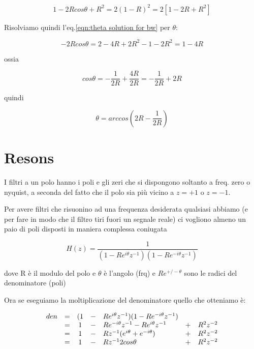 		\begin{equation}\label{eqn:theta solution for bw}
    1 - 2 R cos \theta + R^2 = 2 (1 - R)^2 = 2 [ 1 - 2R + R^2 ]
		 \end{equation}
  
	Risolviamo quindi l'eq.\ref{eqn:theta solution for bw} per $\theta$:

	\begin{equation}
		- 2 R cos \theta = 2 - 4R + 2 R^2 - 1 - 2 R^2 = 1 - 4 R 
  \end{equation}

	ossia

	\begin{equation}
					cos \theta = -\frac{1}{2 R} + \frac{4 R}{2 R} = - \frac{1}{2R} + 2 R
  \end{equation}

	quindi

	\begin{equation}
		\theta = arccos \left ( 2 R  - \frac{1}{2 R} \right )
	\end{equation}

  
\section{Resons}
  
					I filtri a un polo hanno i poli e gli zeri che si dispongono
    soltanto a freq. zero o nyquist, a seconda del fatto che il polo sia pi\`u
    vicino a $z = +1$ o $z = -1$.
  
	Per avere filtri che risuonino ad una frequenza desiderata qualsiasi abbiamo
    (e per fare in modo che il filtro tiri fuori un segnale reale) ci vogliono
    almeno un paio di poli disposti in maniera complessa coniugata
  
		 \begin{equation}
						 H(z) = \frac{1}{(1 - Re^{i\theta} z^{-1})(1 - Re^{-i\theta} z^{-1})}
		 \end{equation}
  
    dove R \`e il modulo del polo e $\theta$ \`e l'angolo (frq) e $Re^{+/-\theta}$ sono le
    radici del denominatore (poli)
  
	Ora se eseguiamo la moltiplicazione del denominatore quello che otteniamo \`e:
  
		 \begin{equation}
			 \begin{array}{r c c c l c l}
     den & = & (1 & - & Re^{i\theta} z^{-1})(1 - Re^{-i\theta} z^{-1}) & &\\
         & = & 1 & - & Re^{-i\theta} z^{-1} - Re^{i\theta} z^{-1} & + & R^{2} z^{-2}\\
         & = & 1 & - & Rz^{-1} (e^{i\theta} + e^{-i\theta}) & + & R^{2} z^{-2}\\
         & = & 1 & - & Rz^{-1} 2 cos \theta & + & R^{2} z^{-2}\\
		 		\end{array}
		 \end{equation}
  
